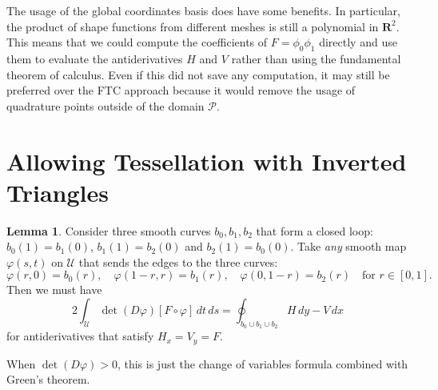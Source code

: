 \documentclass[letterpaper,10pt]{article}
\theoremstyle{definition}
\newtheorem{lemma}{Lemma}[section]
\newcommand{\reals}{\mathbf{R}}
\newcommand{\utri}{\mathcal{U}}
\begin{document}
The usage of the global coordinates basis does have some benefits.
In particular, the product of shape functions from different meshes
is still a polynomial in \(\reals^2\). This means that we could
compute the coefficients of \(F = \phi_0 \phi_1\) directly and
use them to evaluate the antiderivatives \(H\) and \(V\) rather
than using the fundamental theorem of calculus. Even if this
did not save any computation, it may still be preferred over
the FTC approach because it would remove the usage of quadrature
points outside of the domain \(\mathcal{P}\).




\appendix

\section{Allowing Tessellation with Inverted Triangles}

\begin{lemma}\label{lemma:bad-triangle}
Consider three smooth curves
\(b_0, b_1, b_2\) that form a closed loop: \(b_0(1) = b_1(0)\),
\(b_1(1) = b_2(0)\) and \(b_2(1) = b_0(0)\).
Take \emph{any} smooth map \(\varphi(s, t)\) on \(\utri\) that
sends the edges to the three curves:
\begin{equation}
\varphi(r, 0) = b_0(r), \quad \varphi(1 - r, r) = b_1(r),
  \quad \varphi(0, 1 - r) = b_2(r) \quad \text{for } r \in \left[0, 1\right].
\end{equation}
Then we must have
\begin{equation}
2 \int_{\utri} \det(D\varphi) \left[F \circ \varphi\right] \, dt \, ds =
\oint_{b_0 \cup b_1 \cup b_2} H \, dy - V \, dx
\end{equation}
for antiderivatives that satisfy \(H_x = V_y = F\).

When \(\det(D\varphi) > 0\), this is just the change of variables
formula combined with Green's theorem.
\end{lemma}
\end{document}
